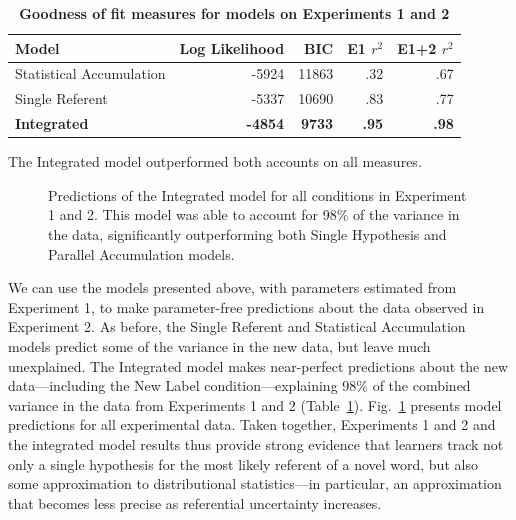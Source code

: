 \documentclass{pnastwo}
\begin{document}
\begin{article}
\begin{table}[tb]
\caption{\textbf{Goodness of fit measures for models on Experiments 1 and 2}}
\label{tab:model}
\begin{center}
\begin{tabular}{lrrrr}
\hline
Model & Log Likelihood &BIC & E1 $r^{2}$ & E1+2 $r^{2}$ \\
\hline
Statistical Accumulation & -5924 & 11863 & .32  & .67\\
Single Referent & -5337 & 10690 & .83 & .77 \\
\textbf{Integrated} & \textbf{-4854} & \textbf{9733} & \textbf{.95}  & \textbf{.98}\\
\hline
\end{tabular}
The Integrated model outperformed both accounts on all measures.
\end{center}
\end{table}





 \begin{figure}[tb]
	\caption{\label{fig:model_fit} Predictions of the Integrated model for all conditions in Experiment 1 and 2. This model was able to account for 98\% of the variance in the data, significantly outperforming both Single Hypothesis and Parallel Accumulation models.}
\end{figure}


We can use the models presented above, with parameters estimated from Experiment 1, to make parameter-free predictions about the data observed in Experiment 2. As before, the Single Referent and Statistical Accumulation models predict some of the variance in the new data, but leave much unexplained. The Integrated model makes near-perfect predictions about the new data---including the New Label condition---explaining 98\% of the combined variance in the data from Experiments 1 and 2 (Table~\ref{tab:model}). Fig.~\ref{fig:model_fit} presents model predictions for all experimental data. Taken together, Experiments 1 and 2 and the integrated model results thus provide strong evidence that learners track not only a single hypothesis for the most likely referent of a novel word, but also some approximation to distributional statistics---in particular, an approximation that becomes less precise as referential uncertainty increases.


\end{article}
\end{document}
